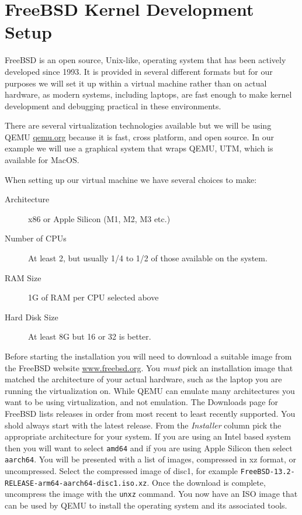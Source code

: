 




\section{FreeBSD Kernel Development Setup}
\label{sec:freebsd-setup}

FreeBSD is an open source, Unix-like, operating system that has been
actively developed since 1993.  It is provided in several different
formats but for our purposes we will set it up within a virtual
machine rather than on actual hardware, as modern systems, including
laptops, are fast enough to make kernel development and debugging
practical in these environments.

There are several virtualization technologies available but we will be
using QEMU \url{qemu.org} because it is fast, cross platform, and open
source.  In our example we will use a graphical system that wraps
QEMU, UTM, which is available for MacOS.

When setting up our virtual machine we have several choices to make:

\begin{description}
\item[Architecture] x86 or Apple Silicon (M1, M2, M3 etc.)
\item[Number of CPUs] At least 2, but usually 1/4 to 1/2 of those
  available on the system.
\item[RAM Size] 1G of RAM per CPU selected above
\item[Hard Disk Size] At least 8G but 16 or 32 is better.
\end{description}

Before starting the installation you will need to download a suitable
image from the FreeBSD website \url{www.freebsd.org}.  You \emph{must}
pick an installation image that matched the architecture of your
actual hardware, such as the laptop you are running the virtualization
on.  While QEMU can emulate many architectures you want to be using
virtualization, and not emulation.  The Downloads page for FreeBSD
lists releases in order from most recent to least recently supported.
You shold always start with the latest release.  From the
\emph{Installer} column pick the appropriate architecture for your
system.  If you are using an Intel based system then you will want to
select \verb|amd64| and if you are using Apple Silicon then select
\verb|aarch64|.  You will be presented with a list of images,
compressed in xz format, or uncompressed.  Select the compressed image
of disc1, for example
\verb|FreeBSD-13.2-RELEASE-arm64-aarch64-disc1.iso.xz|.  Once the
download is complete, uncompress the image with the \verb|unxz|
command.  You now have an ISO image that can be used by QEMU to
install the operating system and its associated tools.

